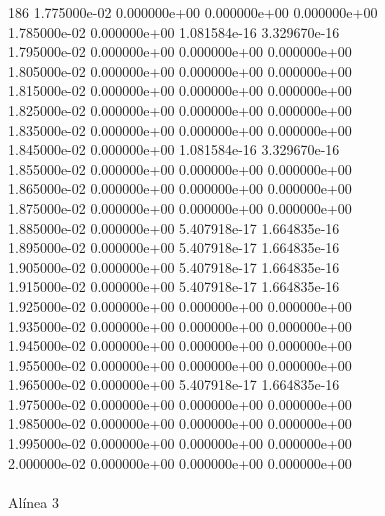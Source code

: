 186	1.775000e-02	0.000000e+00	0.000000e+00	0.000000e+00	\\ 	1.785000e-02	0.000000e+00	1.081584e-16	3.329670e-16	\\ 	1.795000e-02	0.000000e+00	0.000000e+00	0.000000e+00	\\ 	1.805000e-02	0.000000e+00	0.000000e+00	0.000000e+00	\\ 	1.815000e-02	0.000000e+00	0.000000e+00	0.000000e+00	\\ 	1.825000e-02	0.000000e+00	0.000000e+00	0.000000e+00	\\ 	1.835000e-02	0.000000e+00	0.000000e+00	0.000000e+00	\\ 	1.845000e-02	0.000000e+00	1.081584e-16	3.329670e-16	\\ 	1.855000e-02	0.000000e+00	0.000000e+00	0.000000e+00	\\ 	1.865000e-02	0.000000e+00	0.000000e+00	0.000000e+00	\\ 	1.875000e-02	0.000000e+00	0.000000e+00	0.000000e+00	\\ 	1.885000e-02	0.000000e+00	5.407918e-17	1.664835e-16	\\ 	1.895000e-02	0.000000e+00	5.407918e-17	1.664835e-16	\\ 	1.905000e-02	0.000000e+00	5.407918e-17	1.664835e-16	\\ 	1.915000e-02	0.000000e+00	5.407918e-17	1.664835e-16	\\ 	1.925000e-02	0.000000e+00	0.000000e+00	0.000000e+00	\\ 	1.935000e-02	0.000000e+00	0.000000e+00	0.000000e+00	\\ 	1.945000e-02	0.000000e+00	0.000000e+00	0.000000e+00	\\ 	1.955000e-02	0.000000e+00	0.000000e+00	0.000000e+00	\\ 	1.965000e-02	0.000000e+00	5.407918e-17	1.664835e-16	\\ 	1.975000e-02	0.000000e+00	0.000000e+00	0.000000e+00	\\ 	1.985000e-02	0.000000e+00	0.000000e+00	0.000000e+00	\\ 	1.995000e-02	0.000000e+00	0.000000e+00	0.000000e+00	\\ 	2.000000e-02	0.000000e+00	0.000000e+00	0.000000e+00	\\ \hline
\\ \hline
                                   Alínea 3 \\ \hline

